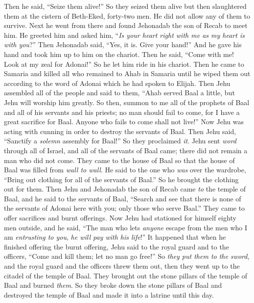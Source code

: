 \begin{biblechapter}
\verse Then he said, “Seize them alive!” So they seized them alive but then slaughtered them at the cistern of Beth-Eked, forty-two men. He did not allow any of them to survive.
\verse Next he went from there and found Jehonadab the son of Recab to meet him. He greeted him and asked him, “\textit{Is your heart right with me as my heart is with you}?” Then Jehonadab said, “Yes, it is. Give your hand!” And he gave his hand and took him up to him on the chariot.
\verse Then he said, “Come with me! Look at my zeal for Adonai!” So he let him ride in his chariot.
\verse Then he came to Samaria and killed all who remained to Ahab in Samaria until he wiped them out according to the word of Adonai which he had spoken to Elijah.
 Then Jehu assembled all of the people and said to them, “Ahab served Baal a little, but Jehu will worship him greatly.
\verse So then, summon to me all of the prophets of Baal and all of his servants and his priests; no man should fail to come, for I have a great sacrifice for Baal. Anyone who fails to come shall not live!” Now Jehu was acting with cunning in order to destroy the servants of Baal.
\verse Then Jehu said, “Sanctify a \textit{solemn} assembly for Baal!” So they proclaimed \textit{it}.
\verse Jehu sent \textit{word} through all of Israel, and all of the servants of Baal came; there did not remain a man who did not come. They came to the house of Baal so that the house of Baal was filled from \textit{wall to wall}.
\verse He said to the one who \textit{was} over the wardrobe, “Bring out clothing for all of the servants of Baal.” So he brought the clothing out for them.
\verse Then Jehu and Jehonadab the son of Recab came \textit{to} the temple of Baal, and he said to the servants of Baal, “Search and see that there is none of the servants of Adonai here with you; only those who serve Baal.”
\verse They came to offer sacrifices and burnt offerings. Now Jehu had stationed for himself eighty men outside, and he said, “The man who lets \textit{anyone} escape from the men who I am \textit{entrusting to you}, \textit{he will pay with his life}!”
\verse It happened that when he finished offering the burnt offering, Jehu said to the royal guard and to the officers, “Come and kill them; let no man go free!” So \textit{they put them to the sword}, and the royal guard and the officers threw them out, then they went up to the citadel of the temple of Baal.
\verse They brought out the stone pillars of the temple of Baal and burned \textit{them}.
\verse So they broke down the stone pillars of Baal and destroyed the temple of Baal and made it into a latrine until this day.

\end{biblechapter}
